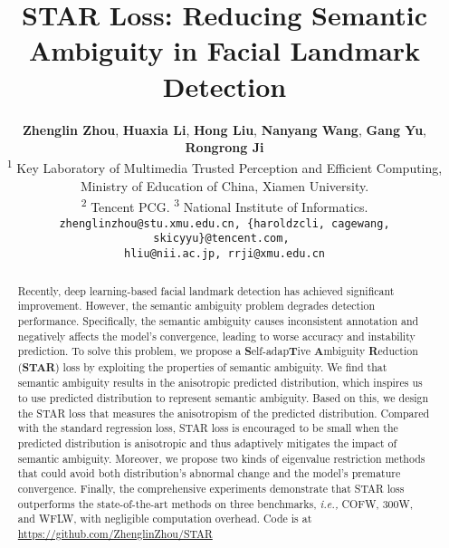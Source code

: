 \documentclass[10pt,twocolumn,letterpaper]{article}
\begin{document}
\title{STAR Loss: Reducing Semantic Ambiguity in Facial Landmark Detection}

\author{\textbf{Zhenglin Zhou}, 
\textbf{Huaxia Li}, 
\textbf{Hong Liu}, 
\textbf{Nanyang Wang}, 
\textbf{Gang Yu}, 
\textbf{Rongrong Ji} \\
\small{
\textsuperscript{\rm 1} Key Laboratory of Multimedia Trusted Perception and Efficient Computing, Ministry of Education of China, Xiamen University.}
\\
\small{
\textsuperscript{\rm 2} Tencent PCG. 
\textsuperscript{\rm 3} National Institute of Informatics.}
\\
{\tt\small zhenglinzhou@stu.xmu.edu.cn, \{haroldzcli, cagewang, skicyyu\}@tencent.com, } \\
{\tt\small hliu@nii.ac.jp, rrji@xmu.edu.cn}
}

\maketitle
\def\thefootnote{}
\def\thefootnote{}
\begin{abstract}
Recently, deep learning-based facial landmark detection has achieved significant improvement.
However, the semantic ambiguity problem degrades detection performance.
Specifically, the semantic ambiguity causes inconsistent annotation and negatively affects the model's convergence, leading to worse accuracy and instability prediction.
To solve this problem, we propose a \textbf{S}elf-adap\textbf{T}ive \textbf{A}mbiguity \textbf{R}eduction (\textbf{STAR}) loss by exploiting the properties of semantic ambiguity.
We find that semantic ambiguity results in the anisotropic predicted distribution, which inspires us to use predicted distribution to represent semantic ambiguity.
Based on this, we design the STAR loss that measures the anisotropism of the predicted distribution.
Compared with the standard regression loss, STAR loss is encouraged to be small when the predicted distribution is anisotropic and thus adaptively mitigates the impact of semantic ambiguity.
Moreover, we propose two kinds of eigenvalue restriction methods that could avoid both distribution's abnormal change and the model's premature convergence.
Finally, the comprehensive experiments demonstrate that STAR loss outperforms the state-of-the-art methods on three benchmarks, \emph{i.e.,} COFW, 300W, and WFLW, with negligible computation overhead.
Code is at \url{https://github.com/ZhenglinZhou/STAR}
\end{abstract}
\end{document}
